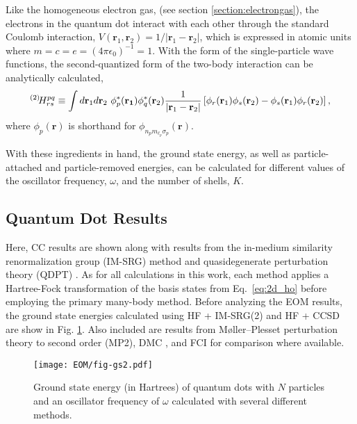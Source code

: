 \documentclass[thesis.tex]{subfiles}
\begin{document}
Like the homogeneous electron gas, (see section \ref{section:electrongas}), the electrons in the quantum dot interact with each other through the standard Coulomb interaction, $V\left( \mathbf{r}_{1}, \mathbf{r}_{2}\right) = 1/\lvert \mathbf{r}_{1} - \mathbf{r}_{2} \rvert$, which is expressed in atomic units where $m = c = e = (4\pi\epsilon_{0})^{-1} = 1$.  With the form of the single-particle wave functions, the second-quantized form of the two-body interaction can be analytically calculated,
\begin{equation} \label{eq:coloumb_integral}
  \Hint{2}{pq}{rs} \equiv \int d\mathbf{r}_{1} d\mathbf{r}_{2}\ \phi^{*}_{p}(\mathbf{r_{1}})\phi^{*}_{q}(\mathbf{r}_{2}) \frac{1}{\lvert \mathbf{r}_{1} - \mathbf{r}_{2} \rvert} \left[\phi_{r}(\mathbf{r}_{1})\phi_{s}(\mathbf{r}_{2}) - \phi_{s}(\mathbf{r}_{1})\phi_{r}(\mathbf{r}_{2})\right],
\end{equation}
where $\phi_{p}(\mathbf{r})$ is shorthand for $\phi_{n_{p} m_{\ell}_{p}\sigma_{p}}(\mathbf{r})$.

With these ingredients in hand, the ground state energy, as well as particle-attached and particle-removed energies, can be calculated for different values of the oscillator frequency, $\omega$, and the number of shells, $K$.

\subsection{Quantum Dot Results}

Here, CC results are shown along with results from the in-medium similarity renormalization group (IM-SRG) method \cite{IMSRG} and quasidegenerate perturbation theory (QDPT) \cite{0022-3700-7-18-010,Kvasnicka1974}.  As for all calculations in this work, each method applies a Hartree-Fock transformation of the basis states from Eq.\ \eqref{eq:2d_ho} before employing the primary many-body method.  Before analyzing the EOM results, the ground state energies calculated using HF + IM-SRG(2) and HF + CCSD are show in Fig. \ref{fig:QDground}.  Also included are results from M\o ller--Plesset perturbation theory to second order (MP2), DMC \cite{hoegberget2013thesis}, and FCI \cite{olsen2013thesis} for comparison where available.

\begin{figure}[h]
  \texttt{[image: EOM/fig-gs2.pdf]}
  \caption{Ground state energy (in Hartrees) of quantum dots with $N$ particles and an oscillator frequency of $\omega$ calculated with several different methods.}
  \label{fig:QDground}
\end{figure}
\end{document}
